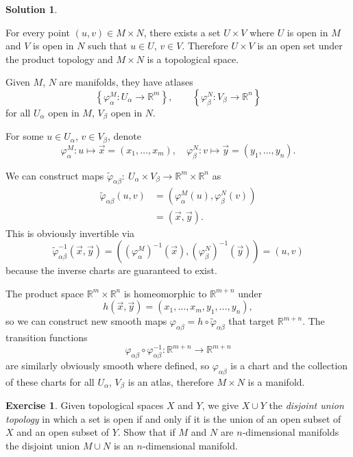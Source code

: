 \documentclass[11pt, a4paper]{report}
\theoremstyle{definition}
\newtheorem{ex}{Exercise}[part]
\newtheorem{sol}{Solution}[part]
\begin{document}
\begin{sol}\label{sol:producttopology}

For every point $(u, v) \in M \times N$, there exists a set $U \times V$ where $U$ is open in $M$ and $V$ is open in $N$ such that $u \in U$, $v \in V$.
Therefore $U \times V$ is an open set under the product topology and $M \times N$ is a topological space.

Given $M$, $N$ are manifolds, they have atlases
\[
    \left\{\varphi^M_\alpha: U_\alpha \to \mathbb{R}^m \right\}, \qquad
    \left\{\varphi^N_\beta: V_\beta \to \mathbb{R}^n \right\}
\]
for all $U_\alpha$ open in $M$, $V_\beta$ open in $N$.

For some $u \in U_\alpha$, $v \in V_\beta$, denote
\[
    \varphi^M_\alpha: u \mapsto \vec{x} = (x_1, \ldots, x_m), \quad
    \varphi^N_\beta: v \mapsto \vec{y} = (y_1, \ldots, y_n).
\]

We can construct maps $\tilde{\varphi}_{\alpha\beta}:\ U_\alpha \times V_\beta \to \mathbb{R}^m \times \mathbb{R}^n$ as
\begin{align*}
    \tilde{\varphi}_{\alpha\beta} (u, v) &= \left(\varphi^M_\alpha(u), \varphi^N_\beta(v)\right) \\
        &= (\vec{x}, \vec{y}).
\end{align*}
This is obviously invertible via
\[
    \tilde{\varphi}_{\alpha\beta}^{-1}(\vec{x}, \vec{y}) = \left({(\varphi^M_\alpha)}^{-1}(\vec{x}), {(\varphi^N_\beta)}^{-1}(\vec{y})\right) = (u, v)
\]
because the inverse charts are guaranteed to exist.

The product space $\mathbb{R}^m \times \mathbb{R}^n$ is homeomorphic to $\mathbb{R}^{m + n}$ under
\[
    h(\vec{x}, \vec{y}) = (x_1, \ldots, x_m, y_1, \ldots, y_n),
\]
so we can construct new smooth maps $\varphi_{\alpha\beta} = h \circ \tilde{\varphi}_{\alpha\beta}$ that target $\mathbb{R}^{m + n}$.
The transition functions
\[
    \varphi_{\alpha\beta} \circ \varphi_{\alpha\beta}^{-1}: \mathbb{R}^{m + n} \to \mathbb{R}^{m + n}
\]
are similarly obviously smooth where defined, so $\varphi_{\alpha\beta}$ is a chart and the collection of these charts for all $U_\alpha$, $V_\beta$ is an atlas, therefore $M \times N$ is a manifold.

\end{sol}

\begin{ex}

Given topological spaces $X$ and $Y$, we give $X \cup Y$ the \emph{disjoint union topology} in which a set is open if and only if it is the union of an open subset of $X$ and an open subset of $Y$.
Show that if $M$ and $N$ are $n$-dimensional manifolds the disjoint union $M \cup N$ is an $n$-dimensional manifold.

\end{ex}
\end{document}
